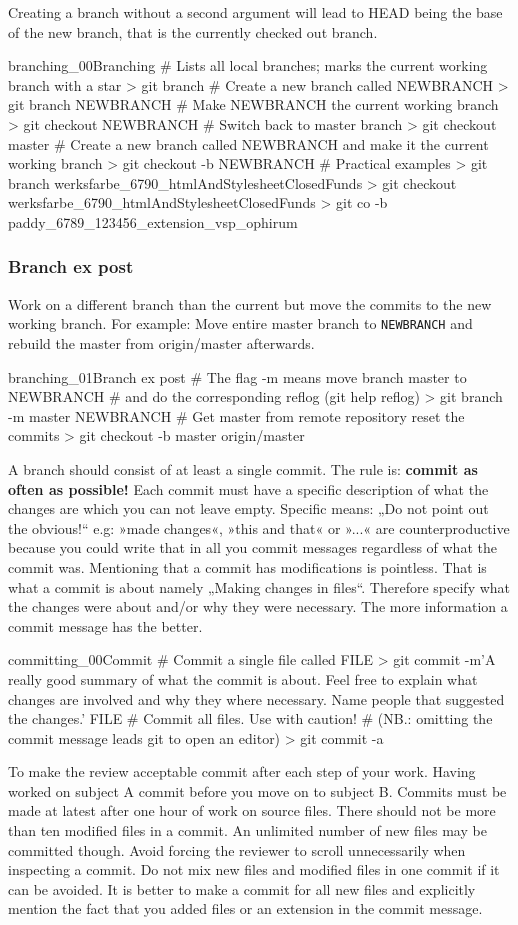 Creating a branch without a second argument will lead to HEAD being the base of the new branch, that is the currently checked out branch.
\begin{codelisting}{branching_00}{Branching}
# Lists all local branches; marks the current working branch with a star
> git branch
# Create a new branch called NEWBRANCH
> git branch NEWBRANCH
# Make NEWBRANCH the current working branch
> git checkout NEWBRANCH
# Switch back to master branch
> git checkout master
# Create a new branch called NEWBRANCH and make it the current working branch
> git checkout -b NEWBRANCH
# Practical examples
> git branch werksfarbe_6790_htmlAndStylesheetClosedFunds
> git checkout werksfarbe_6790_htmlAndStylesheetClosedFunds
> git co -b paddy_6789_123456_extension_vsp_ophirum
\end{codelisting}
\subsubsection{Branch ex post}
Work on a different branch than the current but move the commits to the new working branch. For example: Move entire master branch to \texttt{NEWBRANCH} and rebuild the master from origin/master afterwards. 
\begin{codelisting}{branching_01}{Branch ex post}
# The flag -m means move branch master to NEWBRANCH
# and do the corresponding reflog (git help reflog)
> git branch -m master NEWBRANCH
# Get master from remote repository reset the commits
> git checkout -b master origin/master
\end{codelisting}
A branch should consist of at least a single commit. The rule is: \textbf{commit as often as possible!} Each commit must have a specific description of what the changes are which you can not leave empty. Specific means: „Do not point out the obvious!“ e.g: »made changes«, »this and that« or »...« are counterproductive because you could write that in all you commit messages regardless of what the commit was. Mentioning that a commit has modifications is pointless. That is what a commit is about namely „Making changes in files“. Therefore specify what the changes were about and/or why they were necessary.  The more information a commit message has the better.
\begin{codelisting}{committing_00}{Commit}
# Commit a single file called FILE
> git commit -m'A really good summary of what the commit is about. Feel free to explain what changes are involved and why they where necessary. Name people that suggested the changes.' FILE
# Commit all files. Use with caution!
# (NB.: omitting the commit message leads git to open an editor)
> git commit -a
\end{codelisting}
To make the review acceptable commit after each step of your work. Having worked on subject A commit before you move on to subject B. Commits must be made at latest after one hour of work on source files. There should not be more than ten modified files in a commit. An unlimited number of new files may be committed though. Avoid forcing the reviewer to scroll unnecessarily when inspecting a commit. Do not mix new files and modified files in one commit if it can be avoided. It is better to make a commit for all new files and explicitly mention the fact that you added files or an extension in the commit message.
